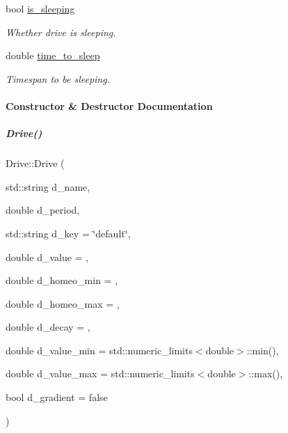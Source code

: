 \begin{DoxyCompactItemize}
bool \hyperlink{group__homeostasis_ab0c97482a89f335c3ed23f3b7ea97551}{is\+\_\+sleeping}
\begin{DoxyCompactList}\small\item\em Whether drive is sleeping. \end{DoxyCompactList}\item 
double \hyperlink{group__homeostasis_a755c6f79b4b5fc2a8be435e03fd76ba4}{time\+\_\+to\+\_\+sleep}
\begin{DoxyCompactList}\small\item\em Timespan to be sleeping. \end{DoxyCompactList}\end{DoxyCompactItemize}


\paragraph{Constructor \& Destructor Documentation}
\mbox{\label{group__homeostasis_ab98d3c78f3e55b972f730e42dd46de31}} 
\subparagraph{\texorpdfstring{Drive()}{Drive()}\hspace{0.1cm}{\footnotesize\ttfamily [1/2]}}
{\footnotesize\ttfamily Drive\+::\+Drive (\begin{DoxyParamCaption}\item[{std\+::string}]{d\+\_\+name,  }\item[{double}]{d\+\_\+period,  }\item[{std\+::string}]{d\+\_\+key = {\ttfamily \char`\"{}default\char`\"{}},  }\item[{double}]{d\+\_\+value = {},  }\item[{double}]{d\+\_\+homeo\+\_\+min = {},  }\item[{double}]{d\+\_\+homeo\+\_\+max = {},  }\item[{double}]{d\+\_\+decay = {},  }\item[{double}]{d\+\_\+value\+\_\+min = {\ttfamily std\+:\+:numeric\+\_\+limits$<$double$>$\+:\+:min()},  }\item[{double}]{d\+\_\+value\+\_\+max = {\ttfamily std\+:\+:numeric\+\_\+limits$<$double$>$\+:\+:max()},  }\item[{bool}]{d\+\_\+gradient = {\ttfamily false} }\end{DoxyParamCaption})\hspace{0.3cm}{\ttfamily [inline]}}



